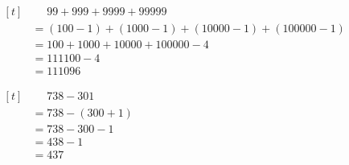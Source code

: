 \documentclass[11pt,a4paper]{article}
\newcommand{\cell}[2]{\begin{minipage}[t]{#1}\strut #2\end{minipage}}
\newenvironment{steps}{\(\begin{aligned}[t]}{\end{aligned}\)}
\begin{document}
\noindent\cell{.67\textwidth}{%
  \begin{steps}
    &\phantom{{}={}}99+999+9999+99999\\
    &=(100-1)+(1000-1)+(10000-1)+(100000-1)\\
    &=100+1000+10000+100000-4\\
    &=111100-4\\
    &=111096
  \end{steps}
}%
\cell{.33\textwidth}{%
  \begin{steps}
    &\phantom{{}={}}738-301\\
    &=738-(300+1)\\
    &=738-300-1\\
    &=438-1\\
    &=437
  \end{steps}
}\par
\end{document}

